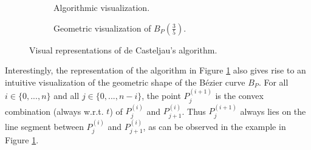 \documentclass[a4paper, 11pt]{report}
\theoremstyle{definition}
\begin{document}
	\begin{figure}[H]
		\centering
		\begin{subfigure}{0.49\textwidth}
			\caption{Algorithmic visualization.}
		\end{subfigure}
		\hfill
		\begin{subfigure}{0.49\textwidth}
			
			\caption{Geometric visualization of $B_P(\frac{3}{5})$.}
		\end{subfigure}
		\caption{Visual representations of de Casteljau's algorithm.}
		\label{fig:decasteljautriangle}
	\end{figure}

	Interestingly, the representation of the algorithm in Figure \ref{fig:decasteljautriangle} also gives rise to an intuitive visualization of the geometric shape of the Bézier curve $B_P$. For all $i \in \{0, ..., n\}$ and all $j \in \{0, ..., n-i\}$, the point $P^{(i+1)}_j$ is the convex combination (always w.r.t. $t$) of $P^{(i)}_j$ and $P^{(i)}_{j+1}$. Thus $P^{(i+1)}_j$ always lies on the line segment between $P^{(i)}_j$ and $P^{(i)}_{j+1}$, as can be observed in the example in Figure \ref{fig:decasteljautriangle}.
\end{document}
